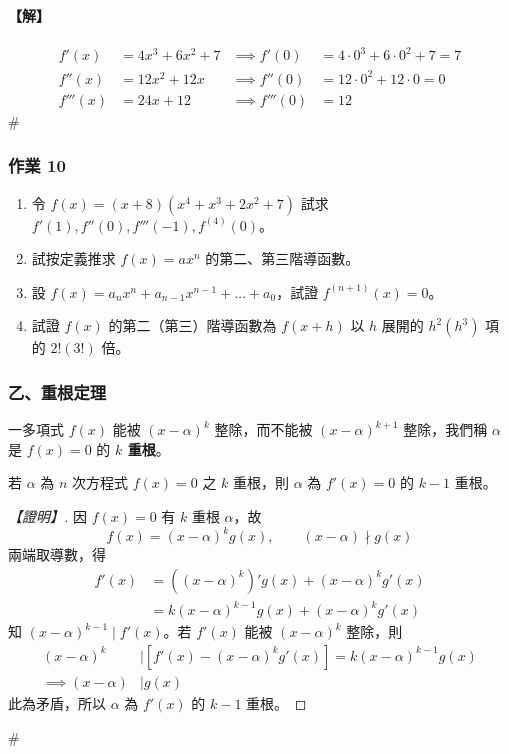 \paragraph{【解】}
\begin{align*}
f'(x) &= 4x^3+6x^2+7 &\implies f'(0) &= 4 \cdot 0^3 + 6 \cdot 0^2 + 7 = 7 \\
f''(x) &= 12x^2+12x &\implies f''(0) &= 12 \cdot 0^2 + 12 \cdot 0 = 0 \\
f'''(x) &= 24x+12 &\implies f'''(0) &= 12
\end{align*}
\hfill$\#$

\subsubsection*{作業 10}\label{hw:b6s-2-10}
\begin{enumerate}[label=(\roman*), leftmargin=2em]
  \item 令 $f(x)=(x+8)(x^4+x^3+2x^2+7)$ 試求 $f'(1), f''(0), f'''(-1), f^{(4)}(0)$。
  \item 試按定義推求 $f(x)=ax^n$ 的第二、第三階導函數。
  \item 設 $f(x)=a_n x^n + a_{n-1} x^{n-1} + \dots + a_0$，試證 $f^{(n+1)}(x) = 0$。
  \item 試證 $f(x)$ 的第二（第三）階導函數為 $f(x+h)$ 以 $h$ 展開的 $h^2(h^3)$ 項的 $2!(3!)$ 倍。
\end{enumerate}

\subsubsection*{乙、重根定理}\label{subsec:b6s-2-4-b}

一多項式 $f(x)$ 能被 $(x-\alpha)^k$ 整除，而不能被 $(x-\alpha)^{k+1}$ 整除，我們稱 $\alpha$ 是 $f(x)=0$ 的 \textbf{$k$ 重根}。

\begin{theorem}[重根定理]\label{thm:b6s-2-multiple-root}
若 $\alpha$ 為 $n$ 次方程式 $f(x)=0$ 之 $k$ 重根，則 $\alpha$ 為 $f'(x)=0$ 的 $k-1$ 重根。
\end{theorem}

\begin{proof}[【證明】]
因 $f(x)=0$ 有 $k$ 重根 $\alpha$，故
\[ f(x) = (x-\alpha)^k g(x), \qquad (x-\alpha) \nmid g(x) \]
兩端取導數，得
\begin{align*}
f'(x) &= ((x-\alpha)^k)' g(x) + (x-\alpha)^k g'(x) \\
&= k(x-\alpha)^{k-1} g(x) + (x-\alpha)^k g'(x)
\end{align*}
知 $(x-\alpha)^{k-1} \mid f'(x)$。若 $f'(x)$ 能被 $(x-\alpha)^k$ 整除，則
\begin{align*}
(x-\alpha)^k &\mid [f'(x) - (x-\alpha)^k g'(x)] = k(x-\alpha)^{k-1} g(x) \\
\implies (x-\alpha) &\mid g(x)
\end{align*}
此為矛盾，所以 $\alpha$ 為 $f'(x)$ 的 $k-1$ 重根。
\end{proof}\hfill$\#$

